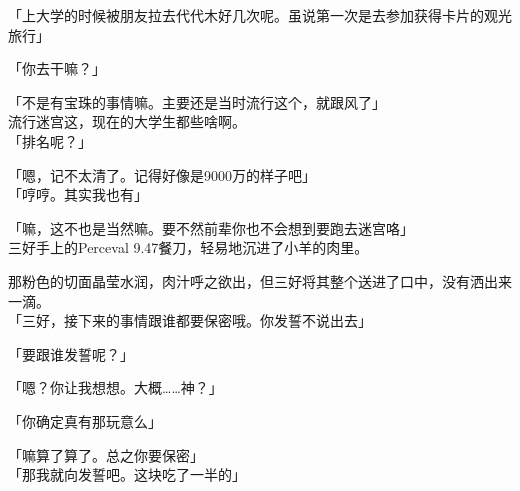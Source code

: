 「上大学的时候被朋友拉去代代木好几次呢。虽说第一次是去参加获得卡片的观光旅行」

「你去干嘛？」

「不是有宝珠的事情嘛。主要还是当时流行这个，就跟风了」\\

流行迷宫这，现在的大学生都些啥啊。\\

「排名呢？」

「嗯，记不太清了。记得好像是9000万的样子吧」\\

「哼哼。其实我也有」

「嘛，这不也是当然嘛。要不然前辈你也不会想到要跑去迷宫咯」\\

三好手上的Perceval 9.47餐刀，轻易地沉进了小羊的肉里。

那粉色的切面晶莹水润，肉汁呼之欲出，但三好将其整个送进了口中，没有洒出来一滴。\\

「三好，接下来的事情跟谁都要保密哦。你发誓不说出去」

「要跟谁发誓呢？」

「嗯？你让我想想。大概……神？」

「你确定真有那玩意么」

「嘛算了算了。总之你要保密」\\

「那我就向发誓吧。这块吃了一半的」


